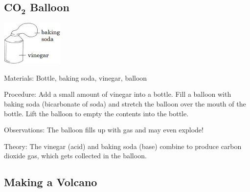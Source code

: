 \begin{multicols}{2}
\subsection{\textbf{CO}$_\textbf{2}$ Balloon}

\begin{center}
\includegraphics[width=0.23\textwidth]{./img/vso/co2-balloon.jpg}
\end{center}

\begin{description*}
\item[Materials:]{Bottle, baking soda, vinegar, balloon}
\item[Procedure:]{Add a small amount of vinegar into a bottle. Fill a balloon with baking soda (bicarbonate of soda) and stretch the balloon over the mouth of the bottle. Lift the balloon to empty the contents into the bottle.}
\item[Observations:]{The balloon fills up with gas and may even explode!}
\item[Theory:]{The vinegar (acid) and baking soda (base) combine to produce carbon dioxide gas, which gets collected in the balloon.}
\end{description*}

\subsection{Making a Volcano} %



\end{multicols}
